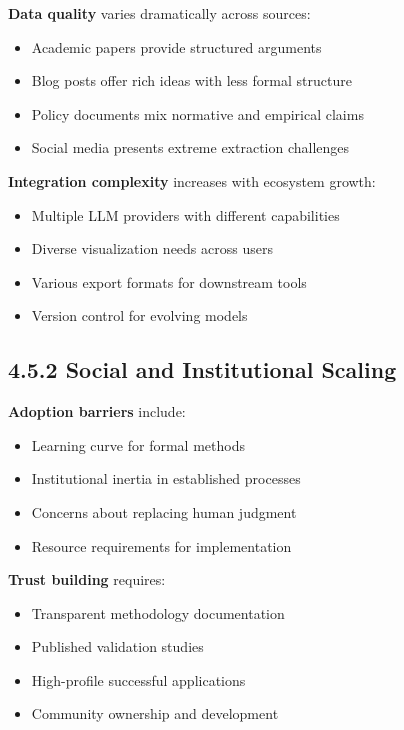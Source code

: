 \documentclass[
  11pt,
  letterpaper,
  openany]{book}
\providecommand{\tightlist}{%
  \setlength{\itemsep}{0pt}\setlength{\parskip}{0pt}}
\begin{document}
\textbf{Data quality} varies dramatically across sources:

\begin{itemize}
\tightlist
\item
  Academic papers provide structured arguments
\item
  Blog posts offer rich ideas with less formal structure
\item
  Policy documents mix normative and empirical claims
\item
  Social media presents extreme extraction challenges
\end{itemize}

\textbf{Integration complexity} increases with ecosystem growth:

\begin{itemize}
\tightlist
\item
  Multiple LLM providers with different capabilities
\item
  Diverse visualization needs across users
\item
  Various export formats for downstream tools
\item
  Version control for evolving models
\end{itemize}

\subsection{4.5.2 Social and Institutional
Scaling}\label{sec-social-scaling}

\textbf{Adoption barriers} include:

\begin{itemize}
\tightlist
\item
  Learning curve for formal methods
\item
  Institutional inertia in established processes
\item
  Concerns about replacing human judgment
\item
  Resource requirements for implementation
\end{itemize}

\textbf{Trust building} requires:

\begin{itemize}
\tightlist
\item
  Transparent methodology documentation
\item
  Published validation studies
\item
  High-profile successful applications
\item
  Community ownership and development
\end{itemize}
\end{document}
